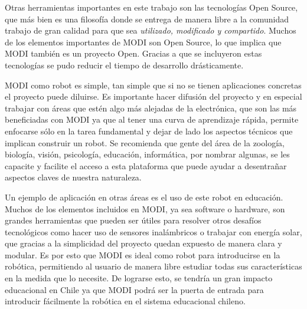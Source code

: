 Otras herramientas importantes en este trabajo son las tecnologías Open Source, que más bien es una filosofía donde se entrega de manera libre a la comunidad trabajo de gran calidad para que sea \textit{utilizado, modificado y compartido}. Muchos de los elementos importantes de MODI son Open Source, lo que implica que MODI también es un proyecto Open. Gracias a que se incluyeron estas tecnologías se pudo reducir el tiempo de desarrollo drásticamente.

MODI como robot es simple, tan simple que si no se tienen aplicaciones concretas el proyecto puede diluirse. Es importante hacer difusión del proyecto y en especial trabajar con áreas que estén algo más alejadas de la electrónica, que son las más beneficiadas con MODI ya que al tener una curva de aprendizaje rápida, permite enfocarse sólo en la tarea fundamental y dejar de lado los aspectos técnicos que implican construir un robot. Se recomienda que gente del área de la zoología, biología, visión, psicología, educación, informática, por nombrar algunas, se les capacite y facilite el acceso a esta plataforma que puede ayudar a desentrañar aspectos claves de nuestra naturaleza.

Un ejemplo de aplicación en otras áreas es el uso de este robot en educación. Muchos de los elementos incluidos en MODI, ya sea software o hardware, son grandes herramientas que pueden ser útiles para resolver otros desafíos tecnológicos como hacer uso de sensores inalámbricos o trabajar con energía solar, que gracias a la simplicidad del proyecto quedan expuesto de manera clara y modular. Es por esto que MODI es ideal como robot para introducirse en la robótica, permitiendo al usuario de manera libre estudiar todas sus características en la medida que lo necesite. De lograrse esto, se tendría un gran impacto educacional en Chile ya que MODI podrá ser la puerta de entrada para introducir fácilmente la robótica en el sistema educacional chileno.